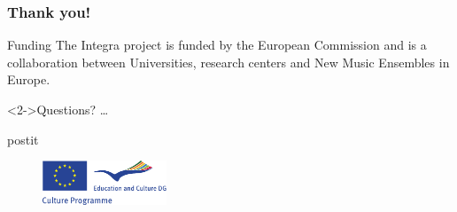 \documentclass[xcolor=table]{beamer}
\begin{document}
\begin{frame}
  \frametitle{Thank you!}


  \begin{block}{Funding}
    The Integra project is funded by the European Commission and is a
    collaboration between Universities, research centers and New Music
    Ensembles in Europe.
  \end{block}

  \begin{block}<2->{Questions?}
    \ldots
  \end{block}

  \vspace{1.5em}
  \hspace{5.6em} 
  \begin{beamercolorbox}[sep=0em,wd=5cm, rounded=true, shadow=true]{postit}
    \begin{figure}[h]
      \centering
      \includegraphics[width=10em]{../img/EU_logo}
    \end{figure}
  \end{beamercolorbox}
\end{frame}
\end{document}
